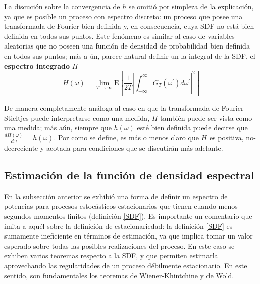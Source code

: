 \documentclass[12pt,a4paper]{mitthesis}
\newcommand{\intR}{\int_{-\infty}^{\infty}}
\newcommand{\prima}{^{\prime}}
\newcommand{\E}[1]{\mathrm{E}\left[ #1 \right]}
\begin{document}
La discuci\'on sobre la convergencia de $h$ se omiti\'o por simpleza de la explicaci\'on, ya que es 
posible un proceso con espectro discreto: un proceso que posee una transformada de Fourier bien 
definida y, en consecuencia, cuya SDF no est\'a bien definida en todos sus puntos.
Este fen\'omeno es similar al caso de variables aleatorias que no poseen una funci\'on de densidad
de probabilidad bien definida en todos sus puntos; m\'as a \'un, parece natural definir un la 
integral de la SDF, el \textbf{espectro integrado} $H$
\begin{equation*}
H(\omega) = \lim_{T\rightarrow \infty} 
\E{ \frac{1}{2 T} \left| \intR G_T(\omega\prima) d\omega\prima \right|^{2} }
\end{equation*}

De manera completamente an\'aloga al caso en que la transformada de Fourier-Stieltjes puede
interpretarse como una medida, $H$ tambi\'en puede ser vista como una medida; m\'as a\'un, siempre 
que $h(\omega)$ est\'e bien definida puede decirse que $\frac{dH(\omega)}{d\omega}= h(\omega)$.
Por como se define, es m\'as o menos claro que $H$ es positiva, no-decreciente y acotada para 
condiciones que se discutir\'an m\'as adelante.


\subsection{Estimaci\'on de la funci\'on de densidad espectral}

En la subsecci\'on anterior se exhibi\'o una forma de definir un espectro de potencias para 
procesos estoc\'asticos estacionarios que tienen cuando menos segundos momentos finitos 
(definici\'on \ref{SDF}). 
Es importante un comentario que imita a aqu\'el sobre la definici\'on de estacionariedad: la 
definici\'on \ref{SDF} es sumamente ineficiente en t\'erminos de estimaci\'on, ya que implica tomar 
un valor esperado sobre todas las posibles realizaciones del proceso.
En este caso se exhiben varios teoremas respecto a la SDF, y que permiten estimarla aprovechando 
las regularidades de un proceso d\'ebilmente estacionario. 
En este sentido, son fundamentales los teoremas de Wiener-Khintchine y de Wold.
\end{document}
